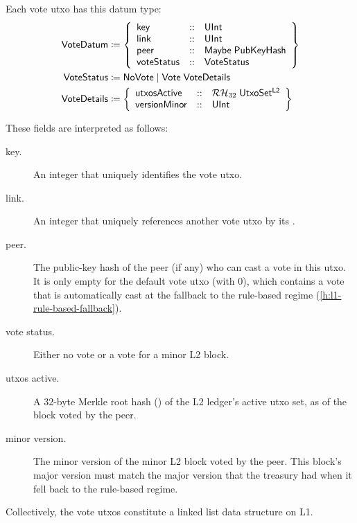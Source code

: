 \documentclass[../hydrozoa.tex]{subfiles}
\begin{document}
Each vote utxo has this datum type:
\begin{equation*}
\begin{split}
  \mathsf{VoteDatum} &\coloneq \left\{
    \begin{array}{lll}
      \mathsf{key}  &::& \mathsf{UInt} \\
      \mathsf{link} &::& \mathsf{UInt} \\
      \mathsf{peer} &::& \mathsf{Maybe} \; \mathsf{PubKeyHash} \\
      \mathsf{voteStatus} &::& \mathsf{VoteStatus}
    \end{array}\right\}\\
  \mathsf{VoteStatus} &\coloneq \mathsf{NoVote} \mid \mathsf{Vote} \; \mathsf{VoteDetails} \\
  \mathsf{VoteDetails} &\coloneq \left\{
    \begin{array}{lll}
      \mathsf{utxosActive} &::& \mathcal{RH}_{32} \; \mathsf{UtxoSet^{L2}} \\
      \mathsf{versionMinor} &::& \mathsf{UInt}
    \end{array}\right\}
\end{split}
\end{equation*}

These fields are interpreted as follows:
\begin{description}
  \item[key.] An integer that uniquely identifies the vote utxo.
  \item[link.] An integer that uniquely references another vote utxo by its .
  \item[peer.] The public-key hash of the peer (if any) who can cast a vote in this utxo.
  It is only empty for the default vote utxo (with  0), which contains a vote that is automatically cast at the fallback to the rule-based regime (\cref{h:l1-rule-based-fallback}).
  \item[vote status.] Either no vote or a vote for a minor L2 block.
  \item[utxos active.] A 32-byte Merkle root hash () of the L2 ledger's active utxo set, as of the block voted by the peer.
  \item[minor version.] The minor version of the minor L2 block voted by the peer.
  This block's major version must match the major version that the treasury had when it fell back to the rule-based regime.
\end{description}

Collectively, the vote utxos constitute a linked list data structure on L1.
\end{document}
